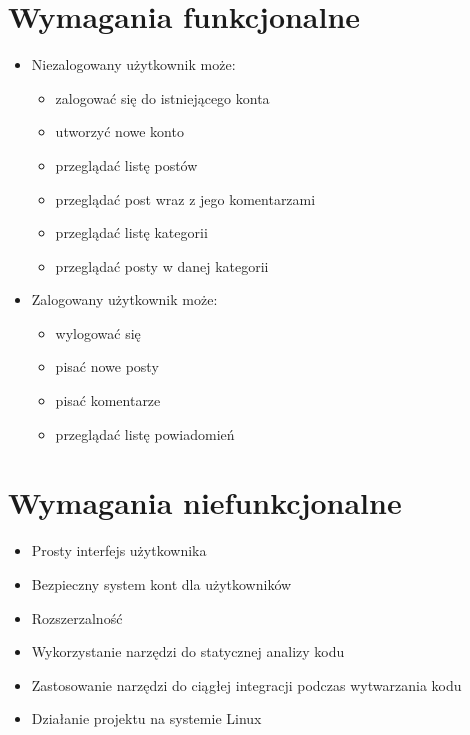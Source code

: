 \documentclass[declaration,shortabstract]{iithesis}
\begin{document}
\section{Wymagania funkcjonalne}

\begin{itemize}
    \item Niezalogowany użytkownik może: 
    \begin{itemize}
         \item zalogować się do istniejącego konta
         \item utworzyć nowe konto
         \item przeglądać listę postów
         \item przeglądać post wraz z jego komentarzami
         \item przeglądać listę kategorii
         \item przeglądać posty w danej kategorii
    \end{itemize}
    \item Zalogowany użytkownik może:
        \begin{itemize}
            \item wylogować się
            \item pisać nowe posty
            \item pisać komentarze
            \item przeglądać listę powiadomień
        \end{itemize}
\end{itemize}

\section{Wymagania niefunkcjonalne}
\begin{itemize}
    \item Prosty interfejs użytkownika
    \item Bezpieczny system kont dla użytkowników
    \item Rozszerzalność
    \item Wykorzystanie narzędzi do statycznej analizy kodu
    \item Zastosowanie narzędzi do ciągłej integracji podczas wytwarzania kodu
    \item Działanie projektu na systemie Linux
    
\end{itemize}

\end{document}
